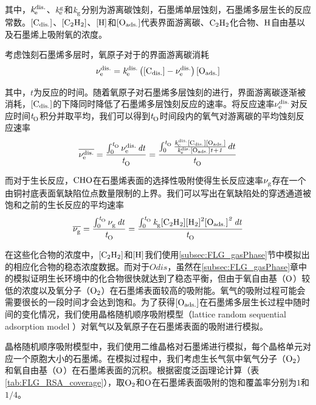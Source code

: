 其中，$\it{k_{\rm e}^{\rm dis.}} \it$、$\it{k_{\rm e}^{\rm g}} \it$和$\it{k_{\rm g}^{\rm }} \it$分别为游离碳蚀刻，石墨烯单层蚀刻，石墨烯多层生长的反应常数。$\rm{\left[C_{dis.}\right]} \it$、$\cemb{[C2H2]}$、$\cemb{[H]}$和$\rm{\left[O_{ads.}\right]} \it$代表界面游离碳、$\cemb{C2H2}$化合物、$\cemb{H}$自由基以及石墨烯上吸附氧的浓度。

考虑蚀刻石墨烯多层时，氧原子对于的界面游离碳消耗\chinesecolon
\begin{equation}
    \nu_{\rm e}^{\rm dis.} \it=\it{k_{\rm e}^{\rm dis.}} \it\left(\rm{\left[C_{dis.}\right]} \it-\nu_{\rm e}^{\rm dis.} \it\right)\rm{\left[O_{ads.}\right]} \it
\end{equation}

其中，$t$为反应的时间。随着氧原子对石墨烯多层蚀刻的进行，界面游离碳逐渐被消耗，$\rm{\left[C_{dis.}\right]} \it$的下降同时降低了石墨烯多层蚀刻反应的速率。将反应速率$\nu_{\rm e}^{\rm dis.} \it$对反应时间$\it{t_{\rm O}^{\rm }} \it$积分并取平均，我们可以得到$\it{t_{\rm O}^{\rm }} \it$时间段内的氧气对游离碳的平均蚀刻反应速率\chinesecolon
\begin{equation}
    \overline{\nu_{\rm e}^{\rm dis.} \it}=\frac{\int_{0}^{\it{t_{\rm O}^{\rm }} \it} \nu_{\rm e}^{\rm dis.} \it \,dt }{\it{t_{\rm O}^{\rm }} \it}=\frac{\int_{0}^{\it{t_{\rm O}^{\rm }} \it} \frac{\it{k_{\rm e}^{\rm dis.}} \it\rm{\left[C_{dis.}\right]} \it\rm{\left[O_{ads.}\right]} \it}{\it{k_{\rm e}^{\rm dis.}} \it\rm{\left[O_{ads.}\right]} \it \it{t_{\rm }^{\rm }} \it + 1} \,dt}{\it{t_{\rm O}^{\rm }} \it}
\end{equation}

而对于生长反应，$\cemb{CHO}$在石墨烯表面的选择性吸附使得生长反应速率$\nu_{\rm g}^{\rm } \it$存在一个由铜衬底表面氧缺陷位点数量限制的上界。我们可以写出在氧缺陷处的穿透通道被饱和之前的生长反应的平均速率\chinesecolon
\begin{equation}
    \overline{\RateV{g}{}}=\frac{\int_{0}^{\ReactTime{O}{}} \RateV{g}{} \,dt }{\ReactTime{O}{}}= \frac{\int_{0}^{\ReactTime{O}{}} \RateK{g}{}\cemb{[C2H2][H2]^2}\Oads^2 \,dt }{\ReactTime{O}{}}
\end{equation}

在这些化合物的浓度中，$\cemb{[C2H2]}$和$\cemb{[H]}$我们使用\ref{subsec:FLG_gasPhase}节中模拟出的相应化合物的稳态浓度数据。而对于$Odis$，虽然在\ref{subsec:FLG_gasPhase}章中的模拟证明生长环境中的化合物很快就达到了稳态平衡，但由于氧自由基（$\cemb{O}$）较低的浓度以及氧分子（$\cemb{O2}$）在石墨烯表面较高的吸附能。氧气的吸附过程可能会需要很长的一段时间才会达到饱和。为了获得$\rm{\left[O_{ads.}\right]} \it$在石墨烯多层生长过程中随时间的变化情况，我们使用晶格随机顺序吸附模型（lattice random sequential adsorption model ）对氧气以及氧原子在石墨烯表面的吸附进行模拟。

晶格随机顺序吸附模型中，我们使用二维晶格对石墨烯进行模拟，每个晶格单元对应一个原胞大小的石墨烯。在模拟过程中，我们考虑生长气氛中氧气分子（$\cemb{O2}$）和氧自由基（$\cemb{O}$）在石墨烯表面的沉积。根据密度泛函理论计算（表\ref{tab:FLG_RSA_coverage}），取$\cemb{O2}$和$\cemb{O}$在石墨烯表面吸附的饱和覆盖率分别为$1$和$1 / 4$。

